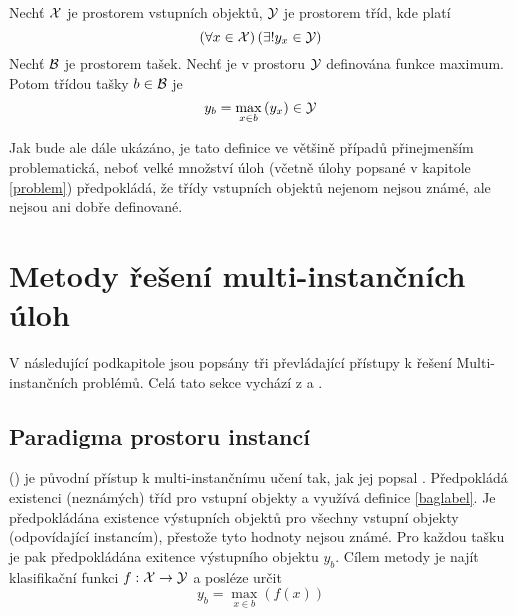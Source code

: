 \begin{define}\label{baglabel}
	Nechť \( \mathcal X \) je prostorem vstupních objektů, \( \mathcal Y \) je prostorem tříd, kde platí
	\[ \left( \forall x \in \mathcal X \right) \left( \exists ! y_x \in \mathcal Y \right) \]
	Nechť \( \mathcal B \) je prostorem tašek. Nechť je v prostoru \( \mathcal Y \) definována funkce maximum. Potom třídou tašky \( b \in \mathcal B \) je
	\[ y_b = \max_{x \in b} \left( y_x \right) \in \mathcal Y \]
\end{define}

Jak bude ale dále ukázáno, je tato definice ve většině případů přinejmenším problematická, neboť velké množství úloh (včetně úlohy popsané v kapitole \ref{problem}) předpokládá, že třídy vstupních objektů nejenom nejsou známé, ale nejsou ani dobře definované.

\section{Metody řešení multi-instančních úloh}

V následující podkapitole jsou popsány tři převládající přístupy k řešení Multi-instančních problémů. Celá tato sekce vychází z \cite{pevny_using_2016} a \cite{pevny_discriminative_2016}.

\subsection{Paradigma prostoru instancí}
 () je původní přístup k multi-instančnímu učení tak, jak jej popsal \cite{dietterich_solving_1997}. Předpokládá existenci (neznámých) tříd pro vstupní objekty a využívá definice \ref{baglabel}.
Je předpokládána existence výstupních objektů pro všechny vstupní objekty (odpovídající instancím), přestože tyto hodnoty nejsou známé. Pro každou tašku je pak předpokládána exitence výstupního objektu \( y_b \). Cílem metody je najít klasifikační funkci \( f : \mathcal X \to \mathcal Y \) a posléze určit
\[ y_b = \max_{x \in b} \left( f \left( x \right) \right) \]


